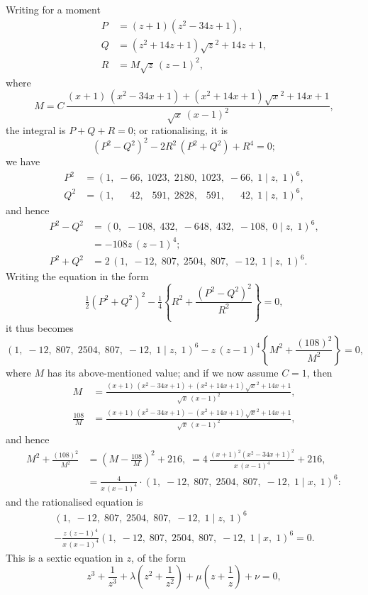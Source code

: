 \documentclass[11pt,a4paper]{book}
\begin{document}
Writing for a moment
\begin{align*}
P&=(z+1)(z^2-34z+1),\\
Q&=(z^2+14z+1)\surd z^2+14z+1,\\
R&=M\surd z\,(z-1)^2,
\end{align*}
where
\[
M=C\,\frac{(x+1)\,(x^2-34x+1)+(x^2+14x+1)\surd x^2+14x+1}
          {\surd x\,(x-1)^2},
\]
the integral is $P+Q+R=0$; or rationalising, it is
\[
(P^2-Q^2)^2-2R^2\,(P^2+Q^2)+R^4=0;
\]
we have
\begin{align*}
P^2&=(1,\; -66,\; 1023,\; 2180,\; 1023,\; -66,\; 1\mid z,\; 1)^6,\\
Q^2&=(1,\; \phantom{-}42,\; \phantom{1}591,\; 2828,\; \phantom{1}591,\; \phantom{-}42,\; 1\mid z,\; 1)^6,
\end{align*}
and hence
\begin{align*}
P^2-Q^2&=(0,\; -108,\; 432,\; -648,\; 432,\; -108,\; 0\mid z,\; 1)^6,\\
&=-108z\,(z-1)^4;\\
P^2+Q^2&=2\,(1,\; -12,\; 807,\; 2504,\; 807,\; -12,\; 1\mid z,\; 1)^6.
\end{align*}
Writing the equation in the form
\[
\tfrac{1}{2}(P^2+Q^2)^2-\tfrac{1}{4}\left\{R^2+\frac{(P^2-Q^2)^2}{R^2}\right\}=0,
\]
it thus becomes
\[
(1,\; -12,\; 807,\; 2504,\; 807,\; -12,\; 1\mid z,\; 1)^6
-z\,(z-1)^4\left\{M^2+\frac{(108)^2}{M^2}\right\}=0,
\]
where $M$ has its above-mentioned value; and if we now assume $C=1$, then
\begin{align*}
M&=\frac{(x+1)\,(x^2-34x+1)+(x^2+14x+1)\surd x^2+14x+1}
        {\surd x\,(x-1)^2},\\
\frac{108}{M}
&=\frac{(x+1)\,(x^2-34x+1)-(x^2+14x+1)\surd x^2+14x+1}
        {\surd x\,(x-1)^2},
\end{align*}
and hence
\begin{align*}
M^2+\frac{(108)^2}{M^2}
&=\left(M-\frac{108}{M}\right)^2+216,\;
 =4\,\frac{(x+1)^2(x^2-34x+1)^2}{x\,(x-1)^4}+216,\\
&=\frac{4}{x\,(x-1)^4}\cdot
   (1,\; -12,\; 807,\; 2504,\; 807,\; -12,\; 1\mid x,\; 1)^6:
\end{align*}
and the rationalised equation is
\begin{multline*}
(1,\; -12,\; 807,\; 2504,\; 807,\; -12,\; 1\mid z,\; 1)^6\\
-\frac{z\,(z-1)^4}{x\,(x-1)^4}
 (1,\; -12,\; 807,\; 2504,\; 807,\; -12,\; 1\mid x,\; 1)^6=0.
\end{multline*}
This is a sextic equation in $z$, of the form
\[
z^3+\frac{1}{z^3}+\lambda\left(z^2+\frac{1}{z^2}\right)+\mu\left(z+\frac{1}{z}\right)+\nu=0,
\]
\end{document}
